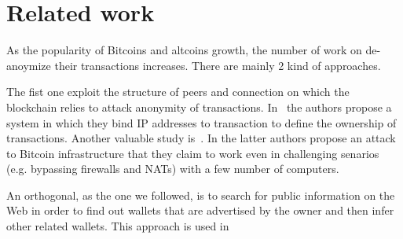 \section{Related work}
As the popularity of Bitcoins and altcoins growth, the number of work on
de-anoymize their transactions increases. There are mainly 2 kind of approaches.

The fist one exploit the structure of peers and connection on which the blockchain relies to attack anonymity of transactions. In~\cite{anonBitcoin} the authors propose a system in which they bind IP addresses to transaction to define the ownership of transactions. Another valuable study is~\cite{deanonP2P}. In the latter authors propose an attack to Bitcoin infrastructure that they claim to work even in challenging senarios (e.g. bypassing firewalls and NATs) with a few number of computers.

An orthogonal, as the one we followed, is to search for public information on the Web in order to find out wallets that are advertised by the owner and then infer other related wallets. This approach is used in~\cite{fistful} 